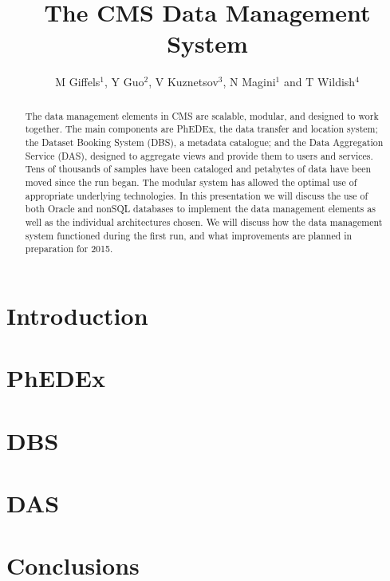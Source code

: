 \documentclass[a4paper]{jpconf}
\begin{document}
\title{The CMS Data Management System}

\author{M Giffels$^1$, Y Guo$^2$, V Kuznetsov$^3$,
        N Magini$^1$ and T Wildish$^4$}

\address{$^1$ CERN, CH-1211 Gen\`eve 23, Switzerland }
\address{$^2$ Fermi National Accelerator Laboratory, Batavia, Il, USA }
\address{$^3$ Cornell University, Ithaca, NY, USA }
\address{$^4$ Princeton University, Princeton, NJ, USA }


\begin{abstract}
The data management elements in CMS are scalable, modular, and designed to work together. The main components are PhEDEx, the data transfer and location system; the Dataset Booking System (DBS), a metadata catalogue; and the Data Aggregation Service (DAS), designed to aggregate views and provide them to users and services. Tens of thousands of samples have been cataloged and petabytes of data have been moved since the run began. The modular system has allowed the optimal use of appropriate underlying technologies. In this presentation we will discuss the use of both Oracle and nonSQL databases to implement the data management elements as well as the individual architectures chosen. We will discuss how the data management system functioned during the first run, and what improvements are planned in preparation for 2015.
\end{abstract}

\section{Introduction}


\section{PhEDEx}


\section{DBS}


\section{DAS}


\section{Conclusions}


\par

\end{document}
